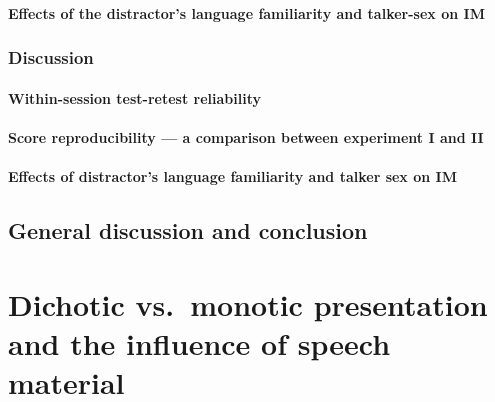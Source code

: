 \documentclass[a4paper,nobind]{templates/ociamthesis}
\begin{document}
\hypertarget{effects-of-the-distractors-language-familiarity-and-talker-sex-on-im}{%
\paragraph{Effects of the distractor's language familiarity and talker-sex on IM}\label{effects-of-the-distractors-language-familiarity-and-talker-sex-on-im}}

\hypertarget{discussion-1}{%
\subsubsection{Discussion}\label{discussion-1}}

\hypertarget{within-session-test-retest-reliability-1}{%
\paragraph{Within-session test-retest reliability}\label{within-session-test-retest-reliability-1}}

\hypertarget{score-reproducibility-a-comparison-between-experiment-i-and-ii-1}{%
\paragraph{Score reproducibility --- a comparison between experiment I and II}\label{score-reproducibility-a-comparison-between-experiment-i-and-ii-1}}

\hypertarget{effects-of-distractors-language-familiarity-and-talker-sex-on-im}{%
\paragraph{Effects of distractor's language familiarity and talker sex on IM}\label{effects-of-distractors-language-familiarity-and-talker-sex-on-im}}

\hypertarget{general-discussion-and-conclusion}{%
\subsection{General discussion and conclusion}\label{general-discussion-and-conclusion}}

\hypertarget{dichotic-vs.-monotic-presentation-and-the-influence-of-speech-material}{%
\section{Dichotic vs.~monotic presentation and the influence of speech material}\label{dichotic-vs.-monotic-presentation-and-the-influence-of-speech-material}}
\end{document}
